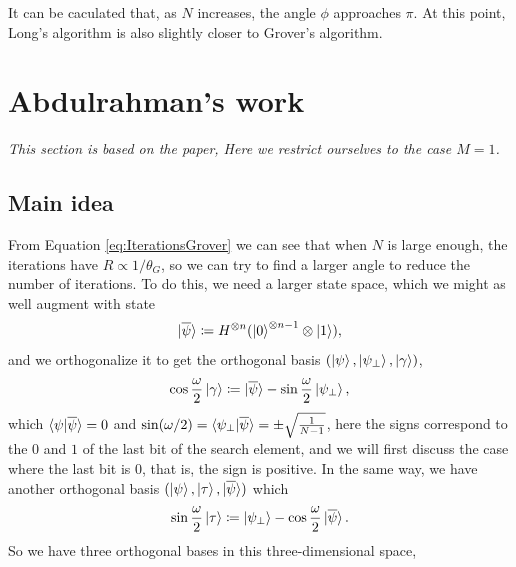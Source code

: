\documentclass[a4paper,10pt]{book}
\numberwithin{equation}{section}
\begin{document}
It can be caculated that, as $N$ increases, the angle $\phi$ approaches $\pi$. At this point, Long's algorithm is also slightly closer to Grover's algorithm.



\chapter{Abdulrahman's work}

\textit{This section is based on the paper\cite{Abdulrahman_2024}, Here we restrict ourselves to the case $M=1$.}

\section{Main idea}

From Equation \ref{eq:IterationsGrover} we can see that when $N$ is large enough, the iterations have $R\propto 1/\theta_{G}$, so we can try to find a larger angle to reduce the number of iterations. To do this, we need a larger state space, which we might as well augment with state
\begin{equation}
    \ket{\overline{\psi}}\coloneqq H^{\otimes n}(\ket{0}^{\otimes n-1}\otimes\ket{1}),
\end{equation}
and we orthogonalize it to get the orthogonal basis $(\ket{\psi},\ket{\psi_{\perp}},\ket{\gamma})$,
\begin{equation}
    \cos\frac{\omega}{2}\ket{\gamma}\coloneqq \ket{\overline{\psi}}-\sin\frac{\omega}{2}\ket{\psi_{\perp}},
\end{equation}
which $\braket{\psi|\overline{\psi}}=0$ and $\sin(\omega/2)=\braket{\psi_{\perp}|\overline{\psi}}=\pm\sqrt{\frac{1}{N-1}}$, here the signs correspond to the $0$ and $1$ of the last bit of the search element, and we will first discuss the case where the last bit is $0$, that is, the sign is positive. In the same way, we have another orthogonal basis $(\ket{\psi},\ket{\tau},\ket{\overline{\psi}})$ which
\begin{equation}
    \sin\frac{\omega}{2}\ket{\tau}\coloneqq \ket{\psi_{\perp}}-\cos\frac{\omega}{2}\ket{\overline{\psi}}.
\end{equation}
So we have three orthogonal bases in this three-dimensional space,
\end{document}
